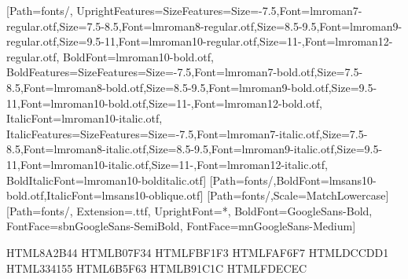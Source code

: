 \usepackage[a4paper,top=20mm,bottom=18mm,left=18mm,right=18mm,
            headsep=5mm,footskip=9mm]{geometry}
\usepackage{fontspec}
\setmainfont{lmroman10-regular.otf}[Path=fonts/,
 UprightFeatures={SizeFeatures={{Size=-7.5,Font=lmroman7-regular.otf},{Size=7.5-8.5,Font=lmroman8-regular.otf},{Size=8.5-9.5,Font=lmroman9-regular.otf},{Size=9.5-11,Font=lmroman10-regular.otf},{Size=11-,Font=lmroman12-regular.otf}}},
 BoldFont=lmroman10-bold.otf,
 BoldFeatures={SizeFeatures={{Size=-7.5,Font=lmroman7-bold.otf},{Size=7.5-8.5,Font=lmroman8-bold.otf},{Size=8.5-9.5,Font=lmroman9-bold.otf},{Size=9.5-11,Font=lmroman10-bold.otf},{Size=11-,Font=lmroman12-bold.otf}}},
 ItalicFont=lmroman10-italic.otf,
 ItalicFeatures={SizeFeatures={{Size=-7.5,Font=lmroman7-italic.otf},{Size=7.5-8.5,Font=lmroman8-italic.otf},{Size=8.5-9.5,Font=lmroman9-italic.otf},{Size=9.5-11,Font=lmroman10-italic.otf},{Size=11-,Font=lmroman12-italic.otf}}},
 BoldItalicFont=lmroman10-bolditalic.otf]
\setsansfont{lmsans10-regular.otf}[Path=fonts/,BoldFont=lmsans10-bold.otf,ItalicFont=lmsans10-oblique.otf]
\setmonofont{lmmono9-regular.otf}[Path=fonts/,Scale=MatchLowercase]
\newfontfamily{}[Path=fonts/, Extension=.ttf,
  UprightFont=*, BoldFont=GoogleSans-Bold,
  FontFace={sb}{n}{GoogleSans-SemiBold}, FontFace={m}{n}{GoogleSans-Medium}]
\newcommand{\gsb}{\fontseries{sb}\selectfont}
\newcommand{\gsm}{\fontseries{m}\selectfont}
\usepackage{microtype}
\usepackage[table]{xcolor}
\usepackage{tikz}
\usetikzlibrary{positioning,arrows.meta,shapes.geometric,calc,fit,backgrounds}
\usepackage{booktabs,tabularx,xltabular,array}
\usepackage{etoolbox,enumitem,titlesec,fancyhdr,pifont,ragged2e,needspace}
\usepackage[most]{tcolorbox}
\usepackage{caption}
\usepackage[hidelinks]{hyperref}

\definecolor{leaf}  {HTML}{8A2B44}  %
\definecolor{amber} {HTML}{B07F34}  %
\definecolor{tint}  {HTML}{FBF1F3}  %
\definecolor{paper} {HTML}{FAF6F7}
\definecolor{rule}  {HTML}{DCCDD1}
\definecolor{slate} {HTML}{334155}
\definecolor{mute}  {HTML}{6B5F63}
\definecolor{bad}   {HTML}{B91C1C}
\definecolor{badlt} {HTML}{FDECEC}


